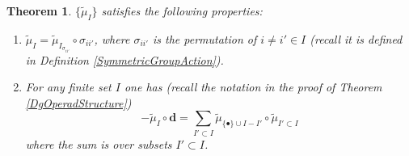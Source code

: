 \documentclass[11pt]{amsart}
\newtheorem{thm}{Theorem}[section]
\theoremstyle{definition}
\theoremstyle{remark}
\numberwithin{equation}{section}
\begin{document}
\begin{thm}
    $\{\tilde{\mu}_{ I}\}$ satisfies the following properties:
    \begin{enumerate}
        \item $\tilde{\mu}_{ I}=\tilde{\mu}_{ I_{\sigma_{ii'}}}\circ{\sigma_{ii'}}$, where $\sigma_{ii'}$ is the permutation of $i\neq i'\in I$ (recall it is defined in Definition \ref{SymmetricGroupAction}).
        \item For any finite set $I$ one has (recall the notation in the proof of Theorem \ref{DgOperadStructure})
        $$
        -\tilde{\mu}_{ I}\circ \mathbf{d}=\sum_{ I'\subset I}\tilde{\mu}_{\{\bullet\}\cup I- I'}\circ \tilde{\mu}_{ I'\subset I}
        $$
        where the sum is over subsets $I' \subset I$.
    \end{enumerate}
\end{thm}
\end{document}

